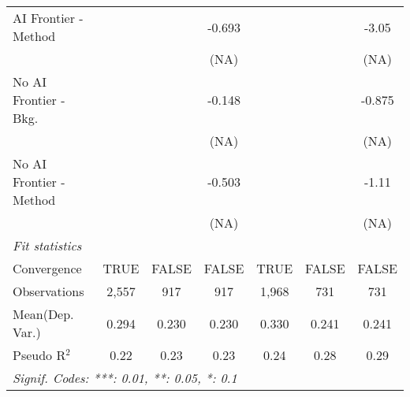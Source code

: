 \begin{tabular}{lcccccc}
   AI Frontier - Method    &                &               & -0.693 &               &       & -3.05\\   
                           &                &               & (NA)   &               &       & (NA)\\   
   No AI Frontier - Bkg.   &                &               & -0.148 &               &       & -0.875\\   
                           &                &               & (NA)   &               &       & (NA)\\   
   No AI Frontier - Method &                &               & -0.503 &               &       & -1.11\\   
                           &                &               & (NA)   &               &       & (NA)\\   
   \midrule
   \emph{Fit statistics}\\
   Convergence             &TRUE            & FALSE         & FALSE  & TRUE          & FALSE & FALSE\\  
   Observations            & 2,557          & 917           & 917    & 1,968         & 731   & 731\\  
Mean(Dep. Var.) & 0.294 & 0.230 & 0.230 & 0.330 & 0.241 & 0.241 \\
   Pseudo R$^2$            & 0.22           & 0.23          & 0.23   & 0.24          & 0.28  & 0.29\\  
   \midrule \midrule
   \multicolumn{7}{l}{\emph{Signif. Codes: ***: 0.01, **: 0.05, *: 0.1}}\\
\end{tabular}
\par\endgroup
